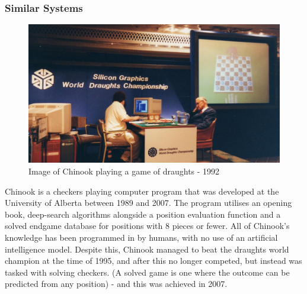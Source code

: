 \documentclass{article}
\begin{document}
    \subsubsection{Similar Systems}
    \begin{figure}
        \centering
        \includegraphics[scale=0.145]{1992Tinsleymatch.jpg}
        \caption{Image of Chinook playing a game of draughts - 1992}
    \end{figure}
    Chinook is a checkers playing computer program that was developed at the University of Alberta between
    1989 and 2007. The program utilises an opening book, deep-search algorithms alongside a position evaluation function
    and a solved endgame database for positions with 8 pieces or fewer.
    All of Chinook's knowledge has been programmed in by humans, with no use of an artificial intelligence model. Despite this,
    Chinook managed to beat the draughts world champion at the time of 1995, and after this no longer competed, but instead was
    tasked with solving checkers. (A solved game is one where the outcome can be predicted from any position) - and this was achieved in 2007.
\end{document}

